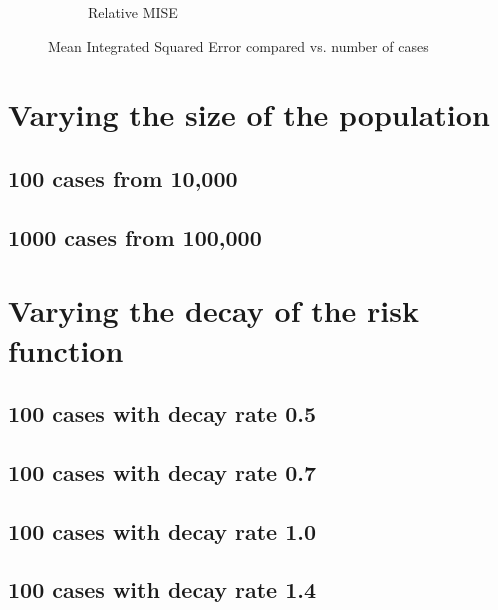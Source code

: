 \begin{figure}[tb]
\begin{subfigure}[b]{0.45\textwidth}
    \caption{Relative MISE}
    \end{subfigure}
    \caption[MISE: by number of cases]{Mean Integrated Squared Error compared vs. number of cases}
    \label{fig:ise:unif_100_unif}
\end{figure}

\section{Varying the size of the population}
\label{sec:results:unifNpop_100_1h}

\subsection{100 cases from 10,000}


\subsection{1000 cases from 100,000}


\section{Varying the decay of the risk function}

\subsection{100 cases with decay rate 0.5}


\subsection{100 cases with decay rate 0.7}


\subsection{100 cases with decay rate 1.0}


\subsection{100 cases with decay rate 1.4}


